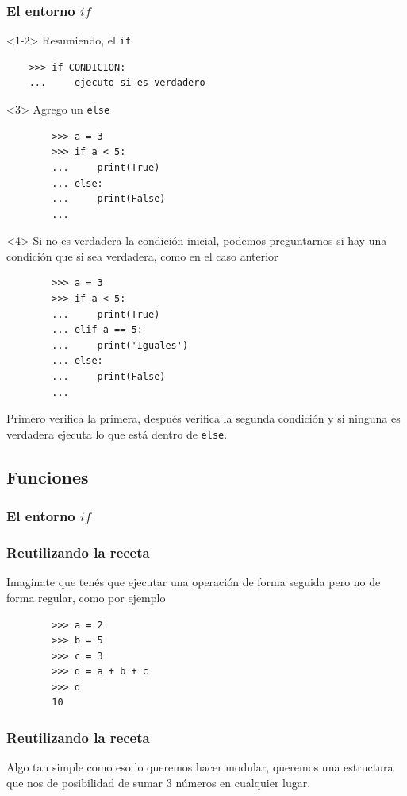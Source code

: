 \documentclass{beamer}
\begin{document}
\begin{frame}[fragile]
    \frametitle{El entorno $if$}
    \begin{onlyenv}<1-2>
    Resumiendo, el \texttt{if}
    \begin{verbatim}
    >>> if CONDICION:
    ...     ejecuto si es verdadero
    \end{verbatim}
    \end{onlyenv}
    \begin{onlyenv}<3>
        Agrego un \texttt{else}
        \begin{verbatim}
        >>> a = 3
        >>> if a < 5:
        ...     print(True)
        ... else:
        ...     print(False)
        ...
    \end{verbatim}
    \end{onlyenv}
    \begin{onlyenv}<4>
        Si no es verdadera la condición inicial, podemos preguntarnos si hay una condición que si sea verdadera, como en el caso anterior
        \begin{verbatim}
        >>> a = 3
        >>> if a < 5:
        ...     print(True)
        ... elif a == 5:
        ...     print('Iguales')
        ... else:
        ...     print(False)
        ...
    \end{verbatim}
    Primero verifica la primera, después verifica la segunda condición y si ninguna es verdadera ejecuta lo que está dentro de \texttt{else}.
    \end{onlyenv}
\end{frame}

\subsection{Funciones}

\begin{frame}[fragile]
    \frametitle{El entorno $if$}
    \frametitle{Reutilizando la receta}
    Imaginate que tenés que ejecutar una operación de forma seguida pero no de forma regular, como por ejemplo
    \begin{verbatim}
        >>> a = 2
        >>> b = 5
        >>> c = 3
        >>> d = a + b + c
        >>> d
        10
    \end{verbatim}
    
    
\end{frame}

\begin{frame}
\frametitle{Reutilizando la receta}
    Algo tan simple como eso lo queremos hacer modular, queremos una estructura que nos de posibilidad de sumar 3 números en cualquier lugar.\\

\end{frame}
\end{document}
